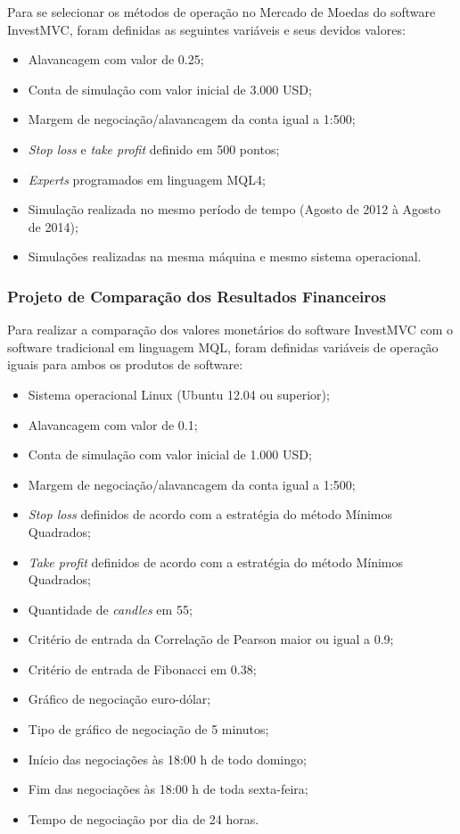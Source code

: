 Para se selecionar os métodos de operação no Mercado de Moedas do software InvestMVC, foram definidas as seguintes variáveis e seus devidos valores:

\begin{itemize}
\item Alavancagem com valor de 0.25;
\item Conta de simulação com valor inicial de 3.000 USD;
\item Margem de negociação/alavancagem da conta igual a 1:500;
\item \textit{Stop loss} e \textit{take profit} definido em 500 pontos;
\item\textit{Experts} programados em linguagem MQL4;
\item Simulação realizada no mesmo período de tempo (Agosto de 2012 à Agosto de 2014);
\item Simulações realizadas na mesma máquina e mesmo sistema operacional.
\end{itemize}

\subsubsection{Projeto de Comparação dos Resultados Financeiros}

Para realizar a comparação dos valores monetários do software InvestMVC com o software tradicional em linguagem MQL, foram definidas variáveis de operação iguais para ambos os produtos de software:

\begin{itemize}
\item Sistema operacional Linux (Ubuntu 12.04 ou superior);
\item Alavancagem com valor de 0.1;
\item Conta de simulação com valor inicial de 1.000 USD;
\item Margem de negociação/alavancagem da conta igual a 1:500;
\item \textit{Stop loss} definidos de acordo com a estratégia do método Mínimos Quadrados;
\item \textit{Take profit} definidos de acordo com a estratégia do método Mínimos Quadrados;
\item Quantidade de \textit{candles} em 55;
\item Critério de entrada da Correlação de Pearson maior ou igual a 0.9;
\item Critério de entrada de Fibonacci em 0.38;
\item Gráfico de negociação euro-dólar;
\item Tipo de gráfico de negociação de 5 minutos;
\item Início das negociações às 18:00 h de todo domingo;
\item Fim das negociações às 18:00 h de toda sexta-feira;
\item Tempo de negociação por dia de 24 horas.
\end{itemize}

